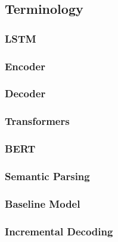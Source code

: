 \subsection{Terminology}

\subsubsection{LSTM}
\subsubsection{Encoder}
\subsubsection{Decoder}
\subsubsection{Transformers}
\subsubsection{BERT}
\subsubsection{Semantic Parsing}
\subsubsection{Baseline Model}
\subsubsection{Incremental Decoding}